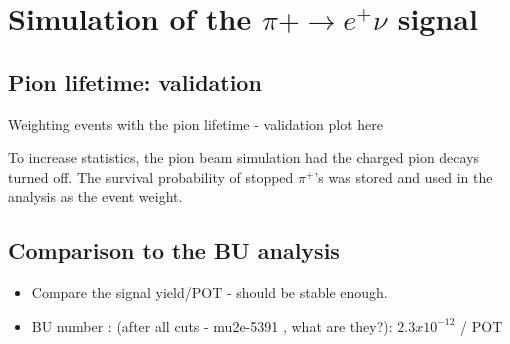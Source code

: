 \section{Simulation of the $\pi+ \to e^+ \nu $ signal }


\subsection {Pion lifetime: validation}

Weighting events with the pion lifetime - validation plot here

\begin{figure}[H]
  \caption{
    \label{fig:pion_lifetime}
  }
\end{figure}

To increase statistics, the pion beam simulation had the charged pion decays turned off.
The survival probability of stopped $\pi^+$'s was stored and used in the analysis
as the event weight.

\subsection{Comparison to the BU analysis}

{\red 
\begin{itemize}
\item 
  Compare the signal yield/POT  - should be stable enough.
\item
  BU number : (after all cuts - mu2e-5391 , what are they?): $2.3 x 10^{-12}$ / POT
\end{itemize}
}

